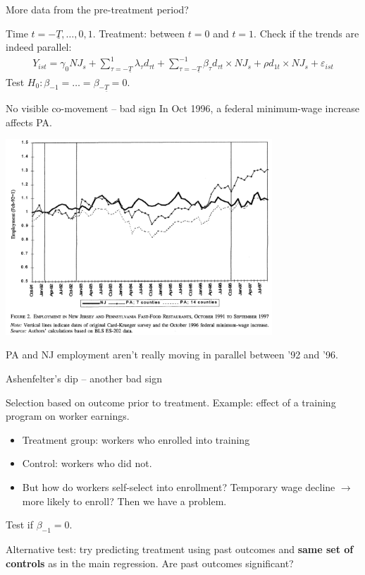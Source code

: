 \documentclass[notes=show,beamer,compress]{beamer}
\begin{document}
\begin{frame}{More data from the pre-treatment period?}

Time $t=-\underline{T},\dots,0,1$. Treatment: between $t=0$ and $t=1$. Check if the trends are indeed parallel:
\begin{align*}
Y_{ist} = \gamma_0NJ_s + \sum_{\tau=-\underline{T}}^1\lambda_\tau{}d_{\tau t} + \sum_{\tau=-\underline{T}}^{-1}\beta_\tau d_{\tau t}\times{}NJ_s + \rho  d_{1 t}\times{}NJ_s + \varepsilon_{ist}
\end{align*}
Test $H_0: \beta_{-1} = \ldots = \beta_{-\underline{T}} = 0$.
\end{frame}

\begin{frame}{No visible co-movement -- bad sign}
In Oct 1996, a federal minimum-wage increase affects PA.
\begin{center}
\includegraphics[width=0.75\textwidth]{graphs/card-krueger2000.png}
\end{center}
PA and NJ employment aren't really moving in parallel between '92 and '96.
\end{frame}

\begin{frame}{Ashenfelter's dip -- another bad sign}

Selection based on outcome prior to treatment. Example: effect of a training program on worker earnings. 
\begin{itemize}
	\item{Treatment group: workers who enrolled into training}
	\item{Control: workers who did not.}
	\item{But how do workers self-select into enrollment? Temporary wage decline $\to$ more likely to enroll? Then we have a problem.}
\end{itemize}
Test if $\beta_{-1} = 0$.\bigskip

Alternative test: try predicting treatment using past outcomes and \textbf{same set of controls} as in the main regression. Are past outcomes significant?
\end{frame}
\end{document}
